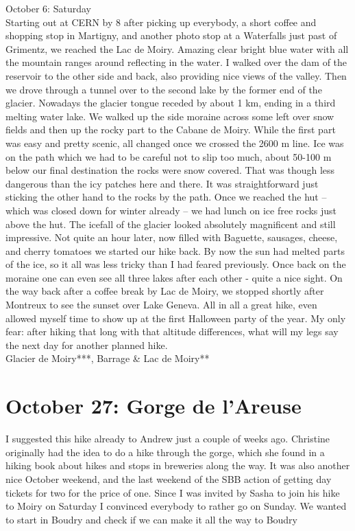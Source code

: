 October 6: Saturday\\
Starting out at CERN by 8 after picking up everybody, a short coffee and shopping stop in Martigny, and another photo stop at a Waterfalls just past of Grimentz, we reached the Lac de Moiry. Amazing clear bright blue water with all the mountain ranges around reflecting in the water. I walked over the dam of the reservoir to the other side and back, also providing nice views of the valley. Then we drove through a tunnel over to the second lake by the former end of the glacier. Nowadays the glacier tongue receded by about 1 km, ending in a third melting water lake. We walked up the side moraine across some left over snow fields and then up the rocky part to the Cabane de Moiry. While the first part was easy and pretty scenic, all changed once we crossed the 2600 m line. Ice was on the path which we had to be careful not to slip too much, about 50-100 m below our final destination the rocks were snow covered. That was though less dangerous than the icy patches here and there. It was straightforward just sticking the other hand to the rocks by the path. Once we reached the hut -- which was closed down for winter already -- we had lunch on ice free rocks just above the hut. The icefall of the glacier looked absolutely magnificent and still impressive. Not quite an hour later, now filled with Baguette, sausages, cheese, and cherry tomatoes we started our hike back. By now the sun had melted parts of the ice, so it all was less tricky than I had feared previously. Once back on the moraine one can even see all three lakes after each other - quite a nice sight. On the way back after a coffee break by Lac de Moiry, we stopped shortly after Montreux to see the sunset over Lake Geneva. All in all a great hike, even allowed myself time to show up at the first Halloween party of the year. My only fear: after hiking that long with that altitude differences, what will my legs say the next day for another planned hike.\\

Glacier de Moiry***, Barrage \& Lac de Moiry**\\

\section{October 27: Gorge de l'Areuse}
\label{2019:gorgedelareuse}

I suggested this hike already to Andrew just a couple of weeks ago. Christine originally had the idea to do a hike through the gorge, which she found in a hiking book about hikes and stops in breweries along the way. It was also another nice October weekend, and the last weekend of the SBB action of getting day tickets for two for the price of one. Since I was invited by Sasha to join his hike to Moiry on Saturday I convinced everybody to rather go on Sunday. We wanted to start in Boudry and check if we can make it all the way to Boudry\\

